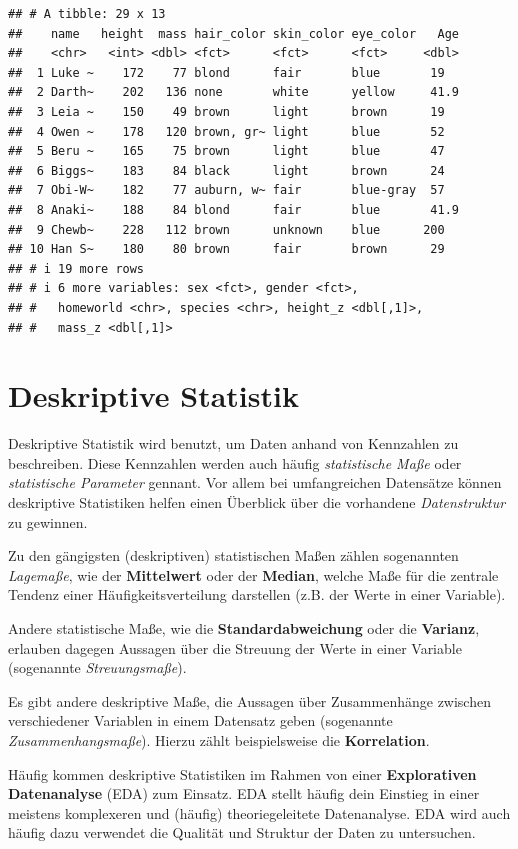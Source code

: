 \documentclass[
  ngerman,
]{book}
\begin{document}
\begin{verbatim}
## # A tibble: 29 x 13
##    name   height  mass hair_color skin_color eye_color   Age
##    <chr>   <int> <dbl> <fct>      <fct>      <fct>     <dbl>
##  1 Luke ~    172    77 blond      fair       blue       19  
##  2 Darth~    202   136 none       white      yellow     41.9
##  3 Leia ~    150    49 brown      light      brown      19  
##  4 Owen ~    178   120 brown, gr~ light      blue       52  
##  5 Beru ~    165    75 brown      light      blue       47  
##  6 Biggs~    183    84 black      light      brown      24  
##  7 Obi-W~    182    77 auburn, w~ fair       blue-gray  57  
##  8 Anaki~    188    84 blond      fair       blue       41.9
##  9 Chewb~    228   112 brown      unknown    blue      200  
## 10 Han S~    180    80 brown      fair       brown      29  
## # i 19 more rows
## # i 6 more variables: sex <fct>, gender <fct>,
## #   homeworld <chr>, species <chr>, height_z <dbl[,1]>,
## #   mass_z <dbl[,1]>
\end{verbatim}

\chapter{Deskriptive Statistik}\label{deskriptive-statistik}

Deskriptive Statistik wird benutzt, um Daten anhand von Kennzahlen zu beschreiben.
Diese Kennzahlen werden auch häufig \emph{statistische Maße} oder \emph{statistische Parameter}
gennant. Vor allem bei umfangreichen Datensätze können deskriptive Statistiken
helfen einen Überblick über die vorhandene \emph{Datenstruktur} zu gewinnen.

Zu den gängigsten (deskriptiven) statistischen Maßen zählen sogenannten \emph{Lagemaße}, wie der
\textbf{Mittelwert} oder der \textbf{Median}, welche Maße für die zentrale Tendenz einer Häufigkeitsverteilung
darstellen (z.B. der Werte in einer Variable).

Andere statistische Maße, wie die \textbf{Standardabweichung} oder die \textbf{Varianz}, erlauben
dagegen Aussagen über die Streuung der Werte in einer Variable (sogenannte \emph{Streuungsmaße}).

Es gibt andere deskriptive Maße, die Aussagen über Zusammenhänge zwischen verschiedener
Variablen in einem Datensatz geben (sogenannte \emph{Zusammenhangsmaße}). Hierzu zählt beispielsweise die \textbf{Korrelation}.

Häufig kommen deskriptive Statistiken im Rahmen von einer \textbf{Explorativen Datenanalyse} (EDA) zum
Einsatz. EDA stellt häufig dein Einstieg in einer meistens komplexeren und (häufig)
theoriegeleitete Datenanalyse. EDA wird auch häufig dazu verwendet die Qualität und Struktur
der Daten zu untersuchen.
\end{document}
